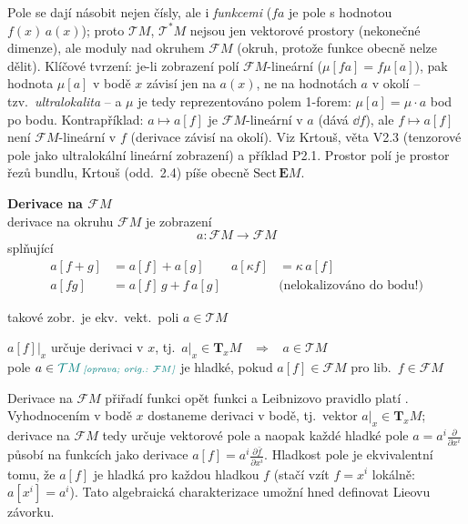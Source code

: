 \begin{vysvetleni}
Pole se dají násobit nejen čísly, ale i \emph{funkcemi} ($fa$ je pole s hodnotou $f(x)\,a(x)$); proto $\mathcal{T}M$, $\mathcal{T}^*M$ nejsou jen vektorové prostory (nekonečné dimenze), ale moduly nad okruhem $\mathcal{F}M$ (okruh, protože funkce obecně nelze dělit). Klíčové tvrzení: je-li zobrazení polí $\mathcal{F}M$-lineární ($\mu[fa]=f\mu[a]$), pak hodnota $\mu[a]$ v bodě $x$ závisí jen na $a(x)$, ne na hodnotách $a$ v okolí -- tzv.\ \emph{ultralokalita} -- a $\mu$ je tedy reprezentováno polem 1-forem: $\mu[a]=\mu\cdot a$ bod po bodu. Kontrapříklad: $a\mapsto a[f]$ je $\mathcal{F}M$-lineární v $a$ (dává $\dd f$), ale $f\mapsto a[f]$ není $\mathcal{F}M$-lineární v $f$ (derivace závisí na okolí). Viz Krtouš, věta V2.3 (tenzorové pole jako ultralokální lineární zobrazení) a příklad P2.1. Prostor polí je prostor řezů bundlu, Krtouš (odd.~2.4) píše obecně $\mathrm{Sect}\,\mathbf{E}M$.
\end{vysvetleni}

\textbf{Derivace na $\mathcal{F}M$} \\
\quad derivace na okruhu $\mathcal{F}M$ je zobrazení
\[
  a:\mathcal{F}M\to\mathcal{F}M
\]
\quad splňující
\begin{align*}
  a[f+g] &= a[f] + a[g] & a[\kappa f] &= \kappa\,a[f] \\
  a[fg] &= a[f]\,g + f\,a[g] & &\text{(nelokalizováno do bodu!)}
\end{align*}
\begin{veta}[Tvrzení]
takové zobr.\ je ekv.\ vekt.\ poli $a\in\mathcal{T}M$
\end{veta}
\quad $a[f]|_x$ určuje derivaci v $x$, tj.\ $a|_x\in\mathbf{T}_xM$ \ $\Rightarrow$ \ $a\in\mathcal{T}M$ \\
\quad pole $a\in\oprava{\mathcal{T}M}{\mathcal{F}M}$ je hladké, pokud $a[f]\in\mathcal{F}M$ pro lib.\ $f\in\mathcal{F}M$

\begin{vysvetleni}[Vektorová pole = derivace okruhu funkcí]
Derivace na $\mathcal{F}M$ přiřadí funkci opět funkci a Leibnizovo pravidlo platí . Vyhodnocením v bodě $x$ dostaneme derivaci v bodě, tj.\ vektor $a|_x\in\mathbf{T}_xM$; derivace na $\mathcal{F}M$ tedy určuje vektorové pole a naopak každé hladké pole $a=a^i\frac{\partial}{\partial x^i}$ působí na funkcích jako derivace $a[f]=a^i\frac{\partial\bar f}{\partial x^i}$. Hladkost pole je ekvivalentní tomu, že $a[f]$ je hladká pro každou hladkou $f$ (stačí vzít $f=x^i$ lokálně: $a[x^i]=a^i$). Tato algebraická charakterizace umožní hned definovat Lieovu závorku.
\end{vysvetleni}

